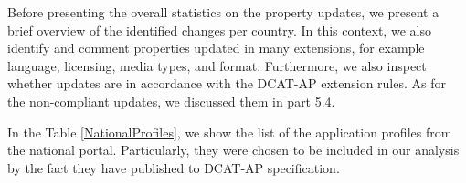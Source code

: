 \documentclass[<options>]{elsarticle}
\begin{document}
Before presenting the overall statistics on the property updates, we present a brief overview of the identified changes per country. In this context, we also identify and comment properties updated in many extensions, for example language, licensing, media types, and format. Furthermore, we also inspect whether updates are in accordance with the DCAT-AP extension rules. As for the non-compliant updates, we discussed them in part 5.4.

In the Table \ref{NationalProfiles}, we show the list of the application profiles from the national portal. Particularly, they were chosen to be included in our analysis by the fact they have published to DCAT-AP specification. 
\\
\\
\\
\end{document}
